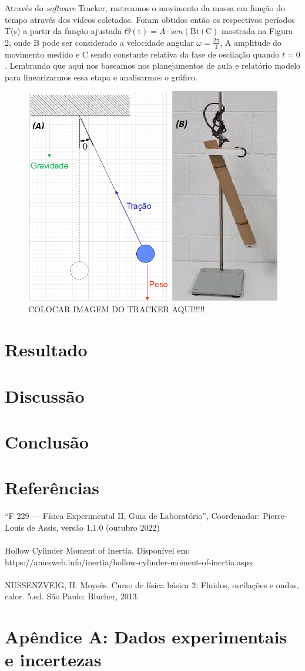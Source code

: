 \documentclass[a4paper]{report}
\begin{document}
\qquad Através do \textit{software} Tracker, rastreamos o movimento da massa em função do tempo através dos vídeos coletados. Foram obtidos então os respectivos períodos T(s) a partir da função ajustada $\Theta(\text{t}) = A\cdot sen(\text{Bt+C})$ mostrada na Figura 2, onde B pode ser considerado a velocidade angular $\omega = \frac{2\pi}{\text{T}}$, A amplitude do movimento medido e C sendo constante relativa da fase de oscilação quando $t = 0$. Lembrando que aqui nos baseamos nos planejamentos de aula e relatório modelo para linearizarmos essa etapa e analisarmos o gráfico. 
\begin{figure}[!htb]
    \centering
    \includegraphics[scale=0.5]{pendulo.png}
    \caption{COLOCAR IMAGEM DO TRACKER AQUI!!!!!}
    \label{fig:enter-label}
\end{figure}
\pagebreak
\section*{Resultado}
\qquad 
\section*{Discussão}
\section*{Conclusão}
\section*{Referências}
“F 229 — Física Experimental II, Guia de Laboratório”, Coordenador: Pierre-Louis de Assis, versão 1.1.0 (outubro 2022) \\ \ \\ 
\qquad Hollow Cylinder Moment of Inertia. Disponível em: https://amesweb.info/inertia/hollow-cylinder-moment-of-inertia.aspx\\ \ \\ 
NUSSENZVEIG, H. Moysés. Curso de física básica 2: Fluidos, oscilações e ondas, calor. 5.ed. São Paulo: Blucher, 2013.
\section*{Apêndice A: Dados experimentais e incertezas}
\end{document}
